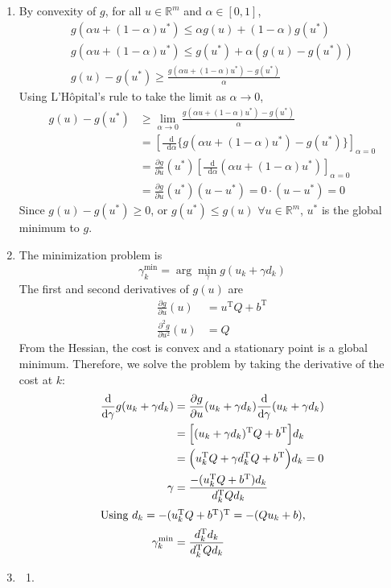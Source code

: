 \documentclass[letterpaper,12pt,titlepage]{article}
\newcommand*\dif{\mathop{}\!\mathrm{d}}
\newcommand{\trans}{^\text{T}}
\newcommand*\pder[2]{\frac{\partial #1}{\partial #2}}
\newcommand*\R{\mathbb{R}}
\begin{document}
\begin{enumerate}[leftmargin=0pt]
\item By convexity of $g$, for all $u\in\R^m$ and $\alpha\in[0,1]$,
  \begin{gather}
    g(\alpha u + (1-\alpha)u^*) \le \alpha g(u) + (1-\alpha)g(u^*) \\
    g(\alpha u + (1-\alpha)u^*) \le g(u^*) + \alpha (g(u)-g(u^*)) \\
    g(u)-g(u^*) \ge \frac{g(\alpha u + (1-\alpha)u^*) - g(u^*)}{\alpha}
  \end{gather}
  Using L'H\^opital's rule to take the limit as $\alpha\to0$,
  \begin{align}
    g(u)-g(u^*) &\ge \lim_{\alpha\to0} \frac{g(\alpha u + (1-\alpha)u^*) - g(u^*)}{\alpha} \\
                &= \left[ \frac{\dif}{\dif\alpha} \Big\{ g(\alpha u + (1-\alpha)u^*) - g(u^*) \Big\} \right]_{\alpha=0} \\
                &= \pder{g}{u}(u^*) \left[ \frac{\dif}{\dif\alpha} (\alpha u + (1-\alpha)u^*) \right]_{\alpha=0} \\
                &= \pder{g}{u}(u^*) (u - u^*) = 0\cdot(u-u^*) = 0
  \end{align}
  Since $g(u)-g(u^*)\ge0$, or $g(u^*)\le g(u)$ $\forall u\in\R^m$, $u^*$ is the global minimum to $g$.


\item The minimization problem is
  \[ \gamma_k^{\min} = \arg\min_\gamma g(u_k+\gamma d_k) \]
  The first and second derivatives of $g(u)$ are
  \begin{align}
    \pder{g}{u}(u) &= u\trans Q + b\trans \\
    \pder{^2 g}{u^2}(u) &= Q
  \end{align}
  From the Hessian, the cost is convex and a stationary point is a global minimum. Therefore, we solve the problem by taking the derivative of the cost at $k$:
  \begin{align}
    \frac{\dif}{\dif\gamma} g(u_k+\gamma d_k) &= \pder{g}{u}(u_k+\gamma d_k) \frac{\dif}{\dif\gamma}(u_k+\gamma d_k) \\
                                              &= \Big[(u_k+\gamma d_k)\trans Q + b\trans\Big] d_k \\
                                              &= \Big(u_k\trans Q + \gamma d_k\trans Q + b\trans\Big) d_k = 0 \\
    \gamma &= \frac{-(u_k\trans Q + b\trans) d_k}{d_k\trans Q d_k} \\
    \shortintertext{Using $d_k=-(u_k\trans Q+b\trans)\trans=-(Qu_k+b)$,}
    \gamma_k^{\min} &= \frac{d_k\trans d_k}{d_k\trans Q d_k}
  \end{align}
  \clearpage
\item \begin{enumerate}
  \item \mbox{}


\end{enumerate}
\end{enumerate}
\end{document}
